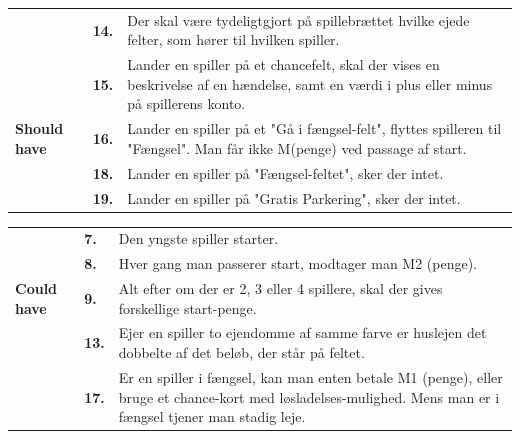     \begin{center}
        \begin{tabular}{ || p{2.5cm} | p{.4cm} | p{12.4cm} ||}
    \hline
    \hline
     &
     \textbf{14.}
     &
     Der skal være tydeligtgjort på spillebrættet hvilke ejede felter, som hører til hvilken spiller.
     \\

     \cline{2-3}
     &
     \textbf{15.}
     &
     Lander en spiller på et chancefelt, skal der vises en beskrivelse af en hændelse, samt en værdi i plus eller minus på spillerens konto.
     \\

     \cline{2-3}
     \textbf{Should have}
     &
     \textbf{16.}
     &
     Lander en spiller på et "Gå i fængsel-felt", flyttes spilleren til "Fængsel". Man får ikke M(penge) ved passage af start.
     \\
    
     \cline{2-3}
     &
     \textbf{18.}
     &
     Lander en spiller på "Fængsel-feltet", sker der intet. \\
    
     \cline{2-3}
     &
     \textbf{19.}
     &
     Lander en spiller på "Gratis Parkering", sker der intet. 
     \\
     \hline
     \hline
        \end{tabular}
    \end{center}

     \begin{center}
        \begin{tabular}{ || p{2.5cm} | p{.4cm} | p{12.4cm} ||}
     \hline
     \hline
     &
     \textbf{7.}
     &
     Den yngste spiller starter.
     \\

     \cline{2-3}
     &
     \textbf{8.}
     &
     Hver gang man passerer start, modtager man M2 (penge).
     \\
     
     \cline{2-3}
     \textbf{Could have}
     &
     \textbf{9.}
     &
     Alt efter om der er 2, 3 eller 4 spillere, skal der gives forskellige start-penge.
     \\

     \cline{2-3}
     &
     \textbf{13.}
     &
     Ejer en spiller to ejendomme af samme farve er huslejen det dobbelte af det beløb, der står på feltet.
     \\

     \cline{2-3}
     &
     \textbf{17.}
     &
     Er en spiller i fængsel, kan man enten betale M1 (penge), eller bruge et chance-kort med løsladelses-mulighed. Mens man er i fængsel tjener man stadig leje. 
     \\
     \hline
     \hline

    \end{tabular}
    \end{center}

